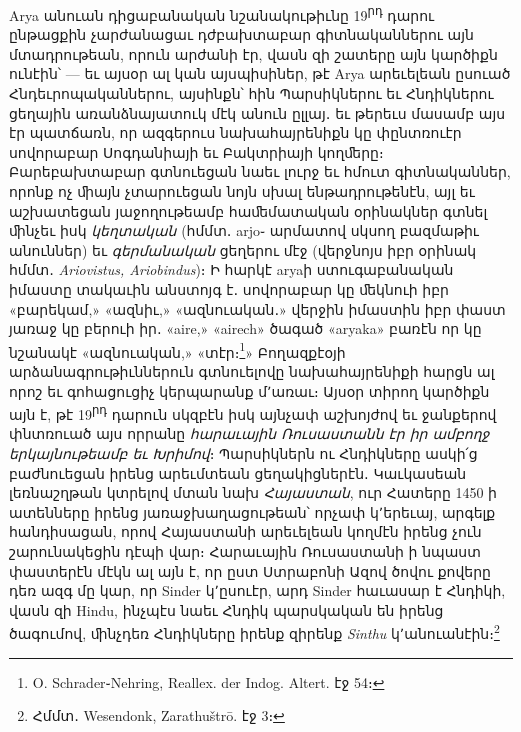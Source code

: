 \documentclass{article}
\begin{document}
{Arya անուան դիցաբանական նշանակութիւնը 19\textsuperscript{րդ} դարու ընթացքին չարժանացաւ դժբախտաբար գիտնականներու այն մտադրութեան, որուն արժանի էր, վասն զի շատերը այն կարծիքն ունէին՝ — եւ այսօր ալ կան այսպիսիներ, թէ Arya արեւելեան ըսուած Հնդեւրոպականներու, այսինքն՝ հին Պարսիկներու եւ Հնդիկներու ցեղային առանձնայատուկ մէկ անուն ըլլայ․ եւ թերեւս մասամբ այս էր պատճառն, որ ազգերուս նախահայրենիքն կը փընտռուէր սովորաբար Սոգդանիայի եւ Բակտրիայի կողﬔրը։ Բարեբախտաբար գտնուեցան նաեւ լուրջ եւ հմուտ գիտնականներ, որոնք ոչ ﬕայն չտարուեցան նոյն սխալ ենթադրութենէն, այլ եւ աշխատեցան յաջողութեամբ հաﬔմատական օրինակներ գտնել ﬕնչեւ իսկ \emph{կեղտական} (հմմտ․ arjo֊ արմատով սկսող բազմաթիւ անուններ) եւ \emph{գերմանական} ցեղերու մէջ (վերջնոյս իբր օրինակ հմմտ․ \emph{Ariovistus, Ariobindus})։ Ի հարկէ aryaի ստուգաբանական իմաստը տակաւին անստոյգ է․ սովորաբար կը ﬔկնուի իբր «բարեկամ,» «ազնիւ,» «ազնուական․» վերջին իմաստին իբր փաստ յառաջ կը բերուի իր․ «aire,» «airech» ծագած «aryaka» բառէն որ կը նշանակէ «ազնուական,» «տէր։\footnote{O. Schrader֊Nehring, Reallex. der Indog. Altert. էջ 54։}» Բողազքէօյի արձանագրութիւններուն գտնուելովը նախահայրենիքի հարցն ալ որոշ եւ գոհացուցիչ կերպարանք մ՚առաւ։ Այսօր տիրող կարծիքն այն է, թէ 19\textsuperscript{րդ} դարուն սկզբէն իսկ այնչափ աշխոյժով եւ ջանքերով փնտռուած այս որրանը \emph{հարաւային Ռուսաստանն էր իր ամբողջ երկայնութեամբ եւ Խրիմով}։ Պարսիկներն ու Հնդիկները ասկի՛ց բաժնուեցան իրենց արեւմտեան ցեղակիցներէն․ Կաւկասեան լեռնաշղթան կտրելով մտան նախ \emph{Հայաստան}, ուր Հատերը 1450 ի ատենները իրենց յառաջխաղացութեան՝ որչափ կ՚երեւայ, արգելք հանդիսացան, որով Հայաստանի արեւելեան կողմէն իրենց չուն շարունակեցին դէպի վար։ Հարաւային Ռուսաստանի ի նպաստ փաստերէն մէկն ալ այն է, որ ըստ Ստրաբոնի Ազով ծովու քովերը դեռ ազգ մը կար, որ Sinder կ՚ըսուէր, արդ Sinder հաւասար է Հնդիկի, վասն զի Hindu, ինչպէս նաեւ Հնդիկ պարսկական են իրենց ծագումով, ﬕնչդեռ Հնդիկները իրենք զիրենք \emph{Sinthu} կ՚անուանէին։\footnote{Հմմտ․ Wesendonk, Zarathuštrō. էջ 3։}

}
\end{document}
